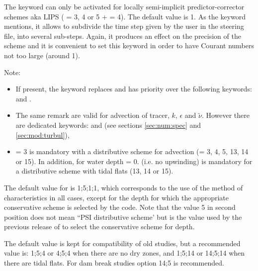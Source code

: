 The keyword  can only be
activated for locally semi-implicit predictor-corrector schemes aka LIPS
( = 3, 4 or 5
+  = 4).
The default value is 1.
As the keyword mentions, it allows to subdivide the time step given by the user
in the steering file, into several sub-steps.
Again, it produces an effect on the precision of the scheme and it is convenient
to set this keyword in order to have Courant numbers not too large (around 1).

\begin{WarningBlock}{Note:}
\begin{itemize}

\item If present, the keyword 
replaces and has priority over the following keywords:
 and .

\item The same remark are valid for advection of tracer, $k$, $\epsilon$ and
$\tilde{\nu}$.
However there are dedicated keywords: 
and 
(see sections \ref{sec:num:spec} and \ref{sec:mod:turbul}),

\item {} = 3 is mandatory with a distributive scheme
for advection (= 3, 4, 5, 13, 14 or 15).
In addition,  for water depth = 0. (i.e. no upwinding) is
mandatory for a distributive scheme with tidal flats (13, 14 or 15).
\end{itemize}
\end{WarningBlock}

The default value for  is 1;5;1;1, which corresponds
to the use of the method of characteristics in all cases, except for the depth
for which the appropriate conservative scheme is selected by the code.
Note that the value 5 in second position does not mean
``PSI distributive scheme' but is the value used by the previous release
of  to select the conservative scheme for depth.

The default value is kept for compatibility of old studies,
but a recommended value is: 1;5;4 or 4;5;4 when there are no dry zones,
and 1;5;14 or 14;5;14 when there are tidal flats.
For dam break studies option 14;5 is recommended.


